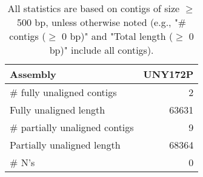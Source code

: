 \documentclass[12pt,a4paper]{article}
\begin{document}
\begin{table}[ht]
\begin{center}
\caption{All statistics are based on contigs of size $\geq$ 500 bp, unless otherwise noted (e.g., "\# contigs ($\geq$ 0 bp)" and "Total length ($\geq$ 0 bp)" include all contigs).}
\begin{tabular}{|l*{1}{|r}|}
\hline
Assembly & UNY172P \\ \hline
\# fully unaligned contigs & 2 \\ \hline
Fully unaligned length & 63631 \\ \hline
\# partially unaligned contigs & 9 \\ \hline
Partially unaligned length & 68364 \\ \hline
\# N's & 0 \\ \hline
\end{tabular}
\end{center}
\end{table}
\end{document}
